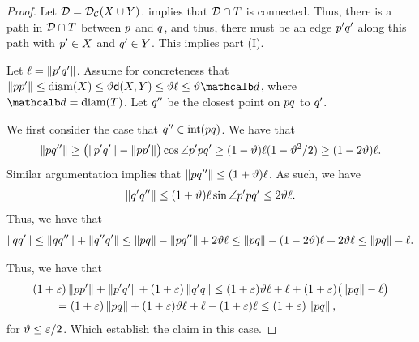 \documentclass[12pt]{article}%
\begin{document}
\begin{proof}
    Let $\mathcal{D} = \mathcal{D}_{\mathcal{C}}(X \cup Y)$.   implies
    that $\mathcal{D} \cap T$ is connected. Thus, there is a path in
    $\mathcal{D} \cap T$ between $p$ and $q$, and thus, there must be
    an edge $p'q'$ along this path with $p' \in X$ and
    $q' \in Y$. This implies part (I).

    Let $\ell = \left\| p' q' \right\|$. Assume for concreteness that
    $\dY{\pa}{\pa'} \leq \diamX{\PX} \leq \epsA \dsY{\PX}{\PY} \leq
    \epsA \ell\leq \epsA \diamC$, where $\diamC=\diamX{\Trap}$. Let
    $q''$ be the closest point on $pq$ to $q'$.

    We first consider the case that $\pb'' \in \interiorX{\pa\pb}$.
    We have that
    \begin{equation*}
        \left\| p q'' \right\|
        \geq
        \bigl(\left\| p' q' \right\| - \left\| p p' \right\| \bigr)
        \cos \angle p'p q'
        \geq
        (1-\vartheta) \ell (1-\vartheta^2/2)
        \geq
        (1-2\vartheta) \ell.
    \end{equation*}
    Similar argumentation implies that
    $\left\| p q'' \right\| \leq (1+\vartheta) \ell$. As such, we have
    \begin{equation*}
        \left\| q' q'' \right\| \leq ( 1+\vartheta)\ell \sin \angle p'p q'
        \leq
        2 \vartheta \ell.
    \end{equation*}
    Thus, we have that
    \begin{equation*}
        \dY{\pb}{\pb'}
        \leq
        \dY{\pb}{\pb''}  + \dY{\pb''}{\pb'}
        \leq%
        \dY{\pa}{\pb} -    \dY{\pa}{\pb''} + 2\epsA \ell
        \leq%
        \dY{\pa}{\pb} - (1-2\epsA)\ell + 2\epsA \ell
        \leq 
        \dY{\pa}{\pb} - \ell.
    \end{equation*}

    Thus, we have that
    \begin{align*}
      &(1+\eps)\dY{\pa}{\pa'} + \dY{\pa'}{\pb'} + (1+\eps)
        \dY{\pb'}{\pb}
        \leq%
        (1+\eps)\epsA \ell
        + \ell + (1+\eps)\bigl(
        \dY{\pa}{\pb} - \ell\bigr)
      \\&%
      \qquad=%
      (1+\eps)\dY{\pa}{\pb}
      +
      (1+\eps)\epsA \ell
      + \ell - (1+\eps)\ell
      \leq%
      (1+\eps)\dY{\pa}{\pb},
    \end{align*}
    for $\vartheta \leq \varepsilon/2$. Which establish the claim in this case.


\end{proof}
\end{document}
